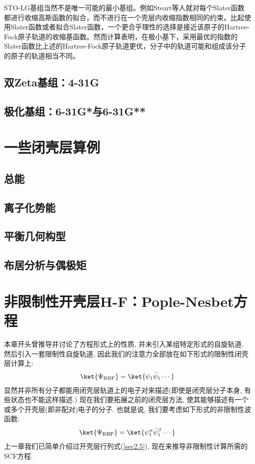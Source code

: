 STO-LG基组当然不是唯一可能的最小基组。例如Steart等人就对每个Slater函数都进行收缩高斯函数的拟合，而不进行在一个壳层内收缩指数相同的约束。比起使用Slater函数或者拟合Slater函数，一个更合乎理性的选择是接近该原子的Hartree-Fock原子轨道的收缩基函数。然而计算表明，在极小基下，采用最优的指数的Slater函数比上述的Hartree-Fock原子轨道更优，分子中的轨道可能和组成该分子的原子的轨道相当不同。
\subsection{双Zeta基组：4-31G}
\subsection{极化基组：6-31G*与6-31G**}
\section{一些闭壳层算例}
\subsection{总能}
\subsection{离子化势能}
\subsection{平衡几何构型}
\subsection{布居分析与偶极矩}

\section{非限制性开壳层H-F：Pople-Nesbet方程}
本章开头曾推导并讨论了\hft 方程形式上的性质, 并未引入某组特定形式的自旋轨道. 然后引入一套限制性自旋轨道, 因此我们的注意力全部放在如下形式的限制性闭壳层计算上:
\begin{align}
\ket{\Psi_\mathrm{RHF}} = \ket{\psi_1\bar{\psi}_1\cdots}
\end{align}
显然并非所有分子都能用闭壳层轨道上的电子对来描述(即使是闭壳层分子本身, 有些状态也不能这样描述.) 现在我们要拓展之前的闭壳层方法, 使其能够描述有一个或多个开壳层(即非配对)电子的分子. 也就是说, 我们要考虑如下形式的非限制性波函数:
\begin{align}
\ket{\Psi_\mathrm{RHF}} = \ket{\psi_1^\alpha\bar{\psi}_1^\beta\cdots}
\end{align}
上一章我们已简单介绍过开壳层行列式(\ref{sec2.5}), 现在来推导非限制性计算所需的SCF方程.

